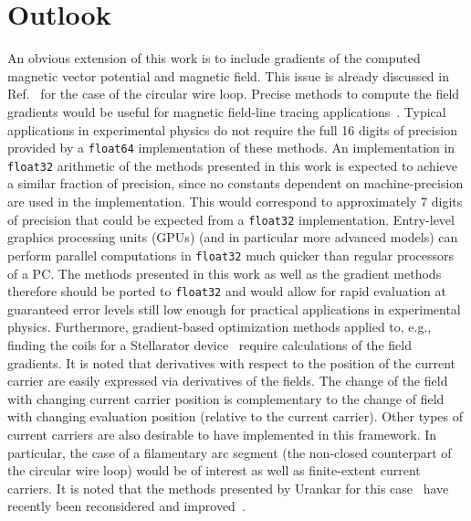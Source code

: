 \section{Outlook}
\label{sec:outlook}
An obvious extension of this work is to include gradients
of the computed magnetic vector potential and magnetic field.
This issue is already discussed in Ref.~\cite{walstrom_2017}
for the case of the circular wire loop.
%
Precise methods to compute the field gradients would be useful for magnetic field-line tracing applications~\cite{bozhenkov_2013}.
Typical applications in experimental physics do not require the full 16 digits of precision
provided by a \texttt{float64} implementation of these methods.
An implementation in \texttt{float32} arithmetic
of the methods presented in this work
is expected to achieve a similar fraction of precision,
since no constants dependent on machine-precision are used in the implementation.
This would correspond to approximately 7 digits of precision
that could be expected from a \texttt{float32} implementation.
Entry-level graphics processing units (GPUs) (and in particular more advanced models)
can perform parallel computations in \texttt{float32} much quicker than regular processors of a PC.
The methods presented in this work as well as the gradient methods therefore should be ported to \texttt{float32}
and would allow for rapid evaluation at guaranteed error levels still low enough for practical applications in experimental physics.
%
Furthermore, gradient-based optimization methods applied to, e.g., finding the coils for a Stellarator device~\cite{zhu_2017}
require calculations of the field gradients.
It is noted that derivatives with respect to the position of the current carrier
are easily expressed via derivatives of the fields.
The change of the field with changing current carrier position is complementary
to the change of field with changing evaluation position (relative to the current carrier).
%
Other types of current carriers are also desirable to have implemented in this framework.
In particular, the case of a filamentary arc segment (the non-closed counterpart of the circular wire loop)
would be of interest as well as finite-extent current carriers.
It is noted that the methods presented by Urankar for this case~\cite{urankar_1,urankar_2,urankar_3,urankar_4,urankar_5}
have recently been reconsidered and improved~\cite{maurer_2020}.
